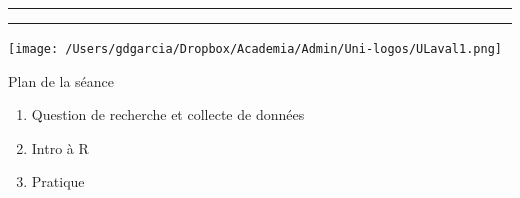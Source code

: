 \documentclass[xcolor=dvipsnames, onlymath, 10pt, aspectratio=169, handout]{beamer}
\title{\course}
\subtitle{\classtopic}
\author{Guilherme D.\ Garcia}
\institute[Université Laval] %
{
  \mylink{https://fr.gdgarcia.ca}{fr.gdgarcia.ca}\vspace{5ex}
}
\date{\classdate}
\begin{document}
\begin{frame}
	\vspace{2ex}
	\textcolor{lav1}{\noindent\rule{0.66\textwidth}{3pt}}
	\textcolor{lav2}{\noindent\rule{0.33\textwidth}{3pt}}

	\titlepage

	\vfill

	\begin{center}
		{\texttt{[image: /Users/gdgarcia/Dropbox/Academia/Admin/Uni-logos/ULaval1.png]}}
	\end{center}

\end{frame}





%  
%
% 
%    




\begin{frame}{Plan de la séance}

	\begin{enumerate}
		\item Question de recherche et collecte de données
		\item Intro à R \citep[chapitres 1--3; 5--7]{barnier_R}
		\item Pratique
	\end{enumerate}

\end{frame}

\end{document}
